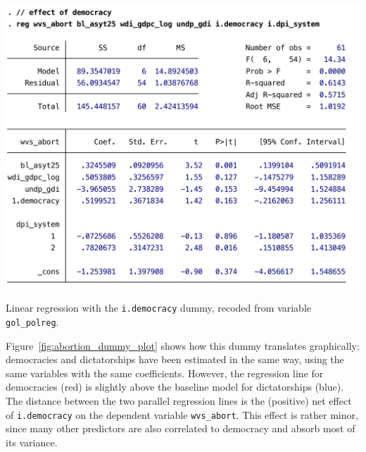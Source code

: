 	\begin{table}[htp]
		\includegraphics[scale=.5]{images/abortion_dummy.pdf}

	  	\caption[Linear regression with a dummy]{\label{tbl:abortion_dummy}
		Linear regression with the \texttt{i.democracy} dummy, recoded from variable \texttt{gol\_polreg}.\\
		\qog}
	\end{table}%
	
	Figure~\ref{fig:abortion_dummy_plot} shows how this dummy translates graphically: democracies and dictatorships have been estimated in the same way, using the same variables with the same coefficients. However, the regression line for democracies (red) is slightly above the baseline model for dictatorships (blue). The distance between the two parallel regression lines is the (positive) net effect of \texttt{i.democracy} on the dependent variable \texttt{wvs\_abort}. This effect is rather minor, since many other predictors are also correlated to democracy and absorb most of its variance.

